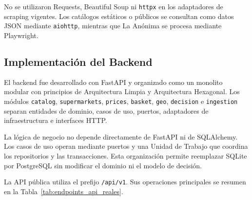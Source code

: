 No se utilizaron Requests, Beautiful Soup ni \texttt{httpx} en los adaptadores
de scraping vigentes. Los catálogos estáticos o públicos se consultan como datos
JSON mediante \texttt{aiohttp}, mientras que La Anónima se procesa mediante
Playwright.

\subsection{Implementación del Backend}

El backend fue desarrollado con FastAPI y organizado como un monolito modular
con principios de Arquitectura Limpia y Arquitectura Hexagonal. Los módulos
\texttt{catalog}, \texttt{supermarkets}, \texttt{prices}, \texttt{basket},
\texttt{geo}, \texttt{decision} e \texttt{ingestion} separan entidades de
dominio, casos de uso, puertos, adaptadores de infraestructura e interfaces HTTP.

La lógica de negocio no depende directamente de FastAPI ni de SQLAlchemy. Los
casos de uso operan mediante puertos y una Unidad de Trabajo que coordina los
repositorios y las transacciones. Esta organización permite reemplazar SQLite
por PostgreSQL sin modificar el dominio ni el modelo de decisión.

La API pública utiliza el prefijo \texttt{/api/v1}. Sus operaciones principales
se resumen en la Tabla~\ref{tab:endpoints_api_reales}.

